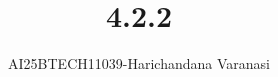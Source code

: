 \documentclass[journal]{IEEEtran}
\begin{document}

\vspace{3cm}

\title{4.2.2}
\author{AI25BTECH11039-Harichandana Varanasi}
 \maketitle
{\let\newpage\relax\maketitle}

\renewcommand{\thefigure}{\theenumi}
\renewcommand{\thetable}{\theenumi}
\setlength{\intextsep}{10pt} %


\renewcommand{\thetable}{\theenumi}



\date{}
\end{document}
